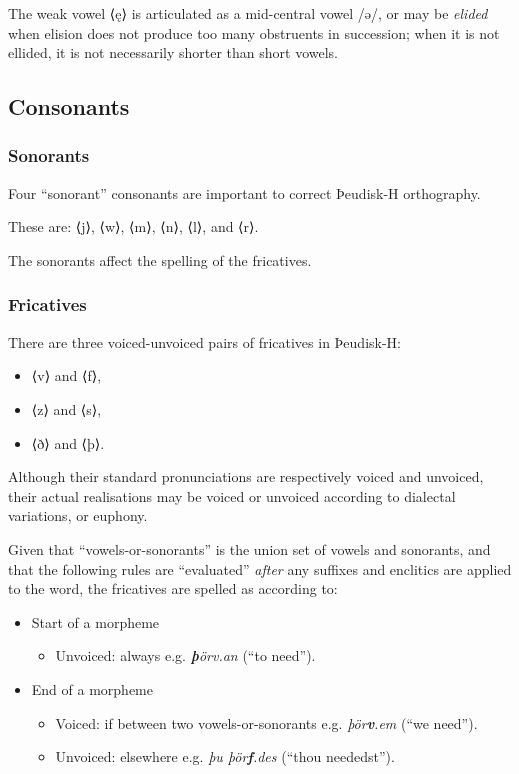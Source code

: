 The weak vowel ⟨ę⟩ is articulated as a mid-central vowel /ə/, or may be \emph{elided} when elision does not produce too many obstruents in succession; when it is not ellided, it is not necessarily shorter than short vowels.

\subsection{Consonants}

\subsubsection{Sonorants}

Four ``sonorant'' consonants are important to correct Þeudisk-H orthography.

These are: ⟨j⟩, ⟨w⟩, ⟨m⟩, ⟨n⟩, ⟨l⟩, and ⟨r⟩.

The sonorants affect the spelling of the fricatives.

\subsubsection{Fricatives}

There are three voiced-unvoiced pairs of fricatives in Þeudisk-H:

\begin{itemize}
\item ⟨v⟩ and ⟨f⟩,
\item ⟨z⟩ and ⟨s⟩,
\item ⟨ð⟩ and ⟨þ⟩.
\end{itemize}

Although their standard pronunciations are respectively voiced and unvoiced,
their actual realisations may be voiced or unvoiced according to dialectal
variations, or euphony.

Given that ``vowels-or-sonorants'' is the union set of vowels and sonorants, and that the following rules are ``evaluated'' \textit{after} any suffixes and enclitics are applied to the word, the fricatives are spelled as according to:

\begin{itemize}
\item Start of a morpheme
    \begin{itemize}
    \item Unvoiced: always e.g. \textit{\textbf{þ}örv.an} (``to need'').
    \end{itemize}
\item End of a morpheme
    \begin{itemize}
    \item Voiced: if between two vowels-or-sonorants e.g. \textit{þör\textbf{v}.em} (``we need'').
    \item Unvoiced: elsewhere e.g. \textit{þu þör\textbf{f}.des} (``thou neededst'').
    \end{itemize}
\end{itemize}